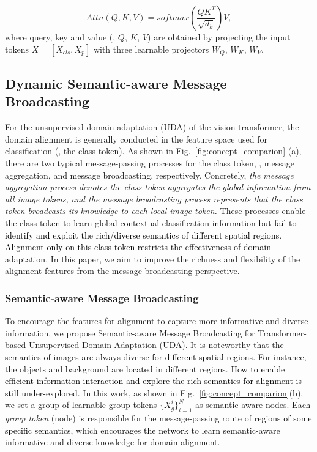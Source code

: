 \documentclass[journal]{IEEEtran}
\newcommand{\tcb}{\textcolor{black}}
\begin{document}
\begin{equation}
    \label{eq:selfattn}
    Attn (Q, K, V) = softmax(\frac{QK^T}{\sqrt{d_k}})V,
\end{equation}
where query, key and value (\ieno, $Q$, $K$, $V$) are obtained by projecting the input tokens $X=[X_{cls}, X_p]$ with three learnable projectors $W_Q$, $W_K$, $W_V$.

\subsection{Dynamic Semantic-aware Message Broadcasting}
For the unsupervised domain adaptation (UDA) of the vision transformer, the domain alignment is generally conducted in the feature space used for classification (\ieno, the class token). As shown in Fig.~\ref{fig:concept_comparion} (a), there are two typical message-passing processes for the class token, \ieno, message aggregation, and message broadcasting, respectively. Concretely, \textit{the message aggregation process denotes the class token aggregates the global information from all image tokens, and the message broadcasting process represents that the class token broadcasts its knowledge to each local image token.} 
These processes enable the class token to learn global contextual classification \tcb{information but fail to identify and exploit the rich/diverse semantics of different spatial regions. Alignment only on this class token restricts the effectiveness of domain adaptation.} 
In this paper, we aim to improve the richness and flexibility of the alignment features from the message-broadcasting perspective. 

\subsubsection{Semantic-aware Message Broadcasting} 
\label{sec:samb}
To encourage the features for alignment to capture more informative and diverse information, we propose Semantic-aware Message Broadcasting for Transformer-based Unsupervised Domain Adaptation (UDA). It is noteworthy that the semantics of images are always diverse \tcb{for different spatial regions}.
For instance, the objects and background are \tcb{located} in different regions. \tcb{How to enable efficient information interaction and explore the rich semantics for alignment is still under-explored.}  
In this work, as shown in Fig.~\ref{fig:concept_comparion}(b), we set a group of learnable group tokens $\{X_g^i\}_{i=1}^N$ as semantic-aware nodes. Each \emph{group token} (node) is responsible for the message-passing route of \tcb{regions of some specific semantics},
which encourages \tcb{the network} to learn semantic-aware informative and diverse knowledge for domain alignment. 
\end{document}
